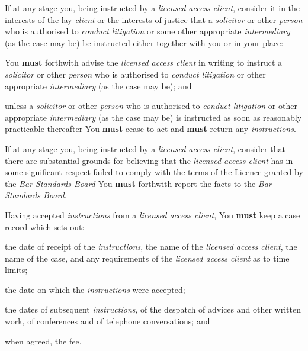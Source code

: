 If at any stage you, being instructed by a \emph{licensed access
client}, consider it in the interests of the lay \emph{client} or the
interests of justice that a \emph{solicitor} or other \emph{person} who
is authorised to \emph{conduct litigation} or some other appropriate
\emph{intermediary} (as the case may be) be instructed either together
with you or in your place:
\begin{numlist}
\item You \textcolor{myred}{\textbf{must}} forthwith advise the \emph{licensed access client} in
writing to instruct a \emph{solicitor} or other \emph{person} who is
authorised to \emph{conduct litigation} or other appropriate
\emph{intermediary} (as the case may be); and

\item unless a \emph{solicitor} or other \emph{person} who is authorised to
\emph{conduct litigation} or other appropriate \emph{intermediary} (as
the case may be) is instructed as soon as reasonably practicable
thereafter You \textcolor{myred}{\textbf{must}} cease to act and \textcolor{myred}{\textbf{must}} return any
\emph{instructions}.
\end{numlist}

If at any stage you, being instructed by a \emph{licensed access
client}, consider that there are substantial grounds for believing that
the \emph{licensed access client} has in some significant respect failed
to comply with the terms of the Licence granted by the \emph{Bar
Standards Board} You \textcolor{myred}{\textbf{must}} forthwith report the facts to the \emph{Bar
Standards Board}.


Having accepted \emph{instructions} from a \emph{licensed access
client}, You \textcolor{myred}{\textbf{must}} keep a case record which sets out:
\begin{numlist}\item the date of receipt of the \emph{instructions}, the name of the
\emph{licensed access client}, the name of the case, and any
requirements of the \emph{licensed access client} as to time limits;
\item the date on which the \emph{instructions} were accepted;
\item the dates of subsequent \emph{instructions}, of the despatch of
advices and other written work, of conferences and of telephone
conversations; and
\item when agreed, the fee.
\end{numlist}

